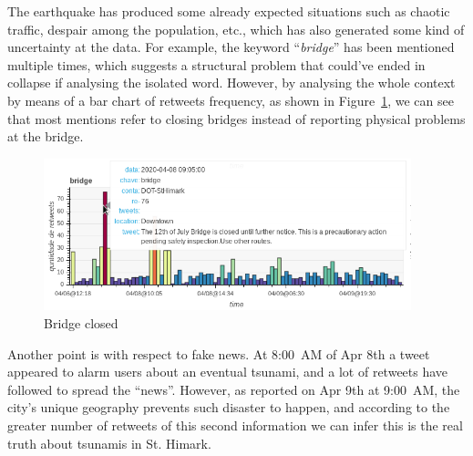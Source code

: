 The earthquake has produced some already expected situations such as chaotic
traffic, despair among the population, etc., which has also generated some kind
of uncertainty at the data. For example, the keyword ``\emph{bridge}'' has been
mentioned multiple times, which suggests a structural problem that could've
ended in collapse if analysing the isolated word. However, by analysing the
whole context by means of a bar chart of retweets frequency, as shown in
Figure~\ref{fig:re_bridge_vbar}, we can see that most mentions refer to closing
bridges instead of reporting physical problems at the bridge.

\begin{figure}[!h]
    \centering
    \includegraphics[width=0.95\textwidth]{figs/q3/re_bridge_vbar.png}
    \caption{Bridge closed}
    \label{fig:re_bridge_vbar}
\end{figure}

Another point is with respect to fake news. At 8:00~AM of Apr 8th a tweet
appeared to alarm users about an eventual tsunami, and a lot of retweets have
followed to spread the ``news''. However, as reported on Apr 9th at 9:00~AM, the
city's unique geography prevents such disaster to happen, and according to the
greater number of retweets of this second information we can infer this is the
real truth about tsunamis in St. Himark.

